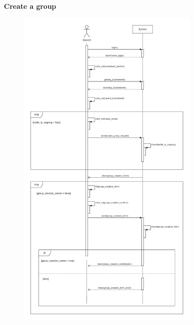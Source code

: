 \documentclass[../RASD.tex]{subfiles}
\begin{document}
    \textbf{Create a group}
    \begin{figure}[h!]
        \centering
        \includegraphics[width=0.8\textwidth]{../assets/section_3/CreateAGroup.png}
    \end{figure}
    \newpage
    \restoregeometry
\end{document}
